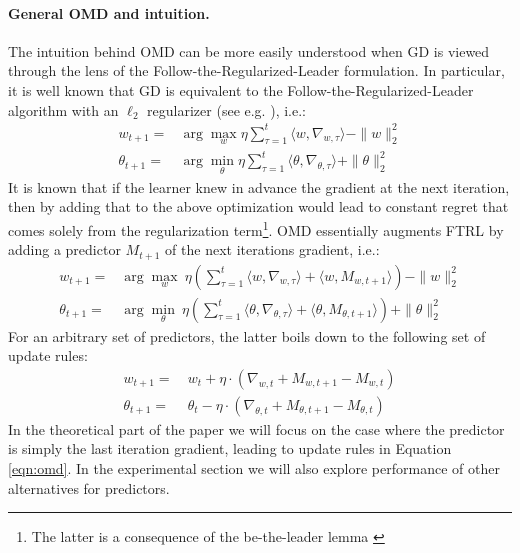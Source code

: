 \paragraph{General OMD and intuition.} The intuition behind OMD can be more easily understood when GD is viewed through the lens of the Follow-the-Regularized-Leader formulation. In particular, it is well known that GD is equivalent to the Follow-the-Regularized-Leader algorithm with an $\ell_2$ regularizer (see e.g. \cite{Shalev2012}), i.e.:
\begin{equation}\label{eqn:ftrl-gen}
\begin{aligned}
w_{t+1} =& \arg\max_{w} \eta \sum_{\tau=1}^t \langle w, \nabla_{w, \tau}\rangle - \|w\|_2^2\\
\theta_{t+1} =& \arg\min_{\theta} \eta \sum_{\tau=1}^t \langle \theta, \nabla_{\theta, \tau}\rangle + \|\theta\|_2^2
\end{aligned}
\end{equation}
It is known that if the learner knew in advance the gradient at the next iteration, then by adding that to the above optimization would lead to constant regret that comes solely from the regularization term\footnote{The latter is a consequence of the be-the-leader lemma \cite{Kalai2005,Rigollet2015}}. OMD essentially augments FTRL by adding a predictor $M_{t+1}$ of the next iterations gradient, i.e.:
\begin{equation}\label{eqn:oftrl-gen}
\begin{aligned}
w_{t+1} =& \arg\max_{w}~ \eta \left(\sum_{\tau=1}^t \langle w, \nabla_{w,\tau}\rangle + \langle w, M_{w, t+1}\rangle \right) - \|w\|_2^2\\
\theta_{t+1} =& \arg\min_{\theta}~ \eta \left(\sum_{\tau=1}^t \langle \theta, \nabla_{\theta, \tau}\rangle + \langle \theta, M_{\theta, t+1}\rangle \right)+ \|\theta\|_2^2
\end{aligned}
\end{equation}
For an arbitrary set of predictors, the latter boils down to the following set of update rules:
\begin{equation}\label{eqn:omd-gen}
\begin{aligned}
w_{t+1} =~& w_t + \eta \cdot \left(\nabla_{w, t} + M_{w, t+1} - M_{w, t}\right)\\
\theta_{t+1} =~& \theta_t - \eta \cdot \left(\nabla_{\theta, t} + M_{\theta, t+1} - M_{\theta, t}\right)
\end{aligned}
\end{equation}
In the theoretical part of the paper we will focus on the case where the predictor is simply the last iteration gradient, leading to update rules in Equation \eqref{eqn:omd}. In the experimental section we will also explore performance of other alternatives for predictors.

